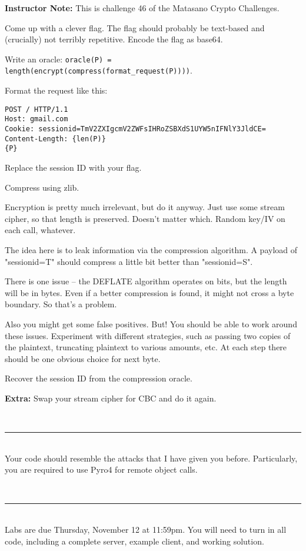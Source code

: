 \documentclass[11pt,oneside]{article}
\newcommand{\sectionfont}{phv} %
\renewcommand{\section}[1] {
    \vspace{12pt}{\quad\fontfamily{\sectionfont}\selectfont\Large\scshape\textbf{#1}}\\[-10pt]
    \vspace{8pt}\rule{\textwidth}{1pt}\\[-16pt]

}
\begin{document}
\ifinstructornotes
\textbf{Instructor Note:} This is challenge 46 of the Matasano Crypto
Challenges.
\fi

Come up with a clever flag. The flag should probably be text-based and
(crucially) not terribly repetitive. Encode the flag as base64.

Write an oracle: \texttt{oracle(P) =
length(encrypt(compress(format\_request(P))))}.

Format the request like this:
\begin{verbatim}
POST / HTTP/1.1
Host: gmail.com
Cookie: sessionid=TmV2ZXIgcmV2ZWFsIHRoZSBXdS1UYW5nIFNlY3JldCE=
Content-Length: {len(P)}
{P}
\end{verbatim}

Replace the session ID with your flag.

Compress using zlib.

Encryption is pretty much irrelevant, but do it anyway. Just use some stream
cipher, so that length is preserved. Doesn't matter which. Random key/IV on each
call, whatever.

The idea here is to leak information via the compression algorithm. A payload of
"sessionid=T" should compress a little bit better than "sessionid=S".

There is one issue -- the DEFLATE algorithm operates on bits, but the length
will be in bytes. Even if a better compression is found, it might not cross a
byte boundary. So that's a problem.

Also you might get some false positives. But! You should be able to work around
these issues. Experiment with different strategies, such as passing two copies of the
plaintext, truncating plaintext to various amounts, etc. At each step there
should be one obvious choice for next byte.

Recover the session ID from the compression oracle.

\textbf{Extra:} Swap your stream cipher for CBC and do it again.

\section{Rules}

Your code should resemble the attacks that I have given you before.
Particularly, you are required to use Pyro4 for remote object calls.

\section{Grading}
Labs are due Thursday, November 12 at 11:59pm. You will need to turn in
all code, including a complete server, example client, and working solution.
\end{document}
